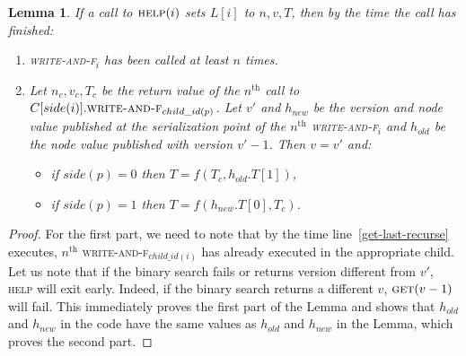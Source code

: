 \documentclass[a4paper,11pt]{article}
\newtheorem{lemma}{Lemma}
\newcommand{\fn}[1]{\textsc{#1}}
\begin{document}
\begin{lemma}
	If a call to $\fn{help}(i)$ sets $L[i]$ to $n, v, T$, then by the time the call has finished: \label{last-is-correct}
\begin{enumerate}
	\item \fn{write-and-f$_i$} has been called at least $n$ times.
	\item Let $n_c, v_c, T_c$ be the return value of the $n^{\text{th}}$ call to $C[side(i)].\fn{write-and-f}_{child\_id(p)}$. Let $v'$ and $h_{new}$ be the version and node value published at the serialization point of the $n^{\text{th}}$
		\fn{write-and-f$_i$} and $h_{old}$ be the node value published with version $v'-1$. Then $v = v'$ and:
		\begin{itemize}
			\item if $side(p) = 0$ then $T = f(T_c, h_{old}.T[1])$,
			\item if $side(p) = 1$ then $T = f(h_{new}.T[0], T_c)$.
		\end{itemize}
\end{enumerate}
\end{lemma}
\begin{proof}
	For the first part, we need to note that by the time line~\ref{get-last-recurse} executes, $n^{\text{th}}$ \fn{write-and-f$_{child\_id(i)}$} has already executed in the appropriate child.
	Let us note that if the binary search fails or returns version different from $v'$, \fn{help} will exit early. Indeed, if the binary search returns a different $v$, $\fn{get}(v-1)$ will fail.
	This immediately proves the first part of the Lemma and shows that $h_{old}$ and $h_{new}$ in the code have the same values as $h_{old}$ and $h_{new}$ in the Lemma, which proves the second part.
\end{proof}
\end{document}
